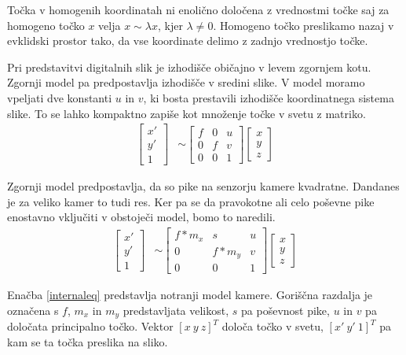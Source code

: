 \documentclass[a4paper, 12pt]{book}
\begin{document}
Točka v homogenih koordinatah ni enolično določena z vrednostmi točke saj za homogeno točko $x$ velja $x \sim \lambda x$, kjer $\lambda \neq 0$. Homogeno točko preslikamo nazaj v evklidski prostor tako, da vse koordinate delimo z zadnjo vrednostjo točke. 

Pri predstavitvi digitalnih slik je izhodišče običajno v levem zgornjem kotu. Zgornji model pa predpostavlja izhodišče v sredini slike. V model moramo vpeljati dve konstanti $u$ in $v$, ki bosta prestavili izhodišče koordinatnega sistema slike. To se lahko kompaktno zapiše kot množenje točke v svetu z matriko.
\begin{align}
\begin{bmatrix}
x' \\
y' \\
1
\end{bmatrix}
&\sim
\begin{bmatrix}
f & 0 & u \\
0 & f & v \\
0 & 0 & 1
\end{bmatrix}
\begin{bmatrix}
x \\
y \\
z
\end{bmatrix}
\end{align}

Zgornji model predpostavlja, da so pike na senzorju kamere kvadratne. Dandanes je za veliko kamer to tudi res. Ker pa se da pravokotne ali celo poševne pike enostavno vključiti v obstoječi model, bomo to naredili.
\begin{align}
\begin{bmatrix}
x' \\
y' \\
1
\end{bmatrix}
&\sim
\begin{bmatrix}
f*m_x & s & u \\
0 & f*m_y & v \\
0 & 0 & 1
\end{bmatrix}
\begin{bmatrix}
x \\
y \\
z
\end{bmatrix}
\label{internaleq}
\end{align}

Enačba \eqref{internaleq} predstavlja notranji model kamere. Goriščna razdalja je označena s $f$, $m_x$ in $m_y$ predstavljata velikost, $s$ pa poševnost pike, $u$ in $v$ pa določata principalno točko. Vektor $[x \ y \ z]^T$ določa točko v svetu, $[x' \ y' \ 1]^T$ pa kam se ta točka preslika na sliko.
\end{document}
